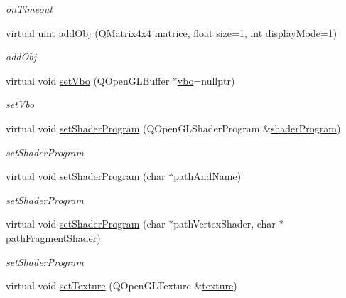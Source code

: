 \begin{DoxyCompactItemize}
\begin{DoxyCompactList}\small\item\em on\+Timeout \end{DoxyCompactList}\item 
virtual uint \hyperlink{classmyObjects_ad4388027a338e2d15f55b87499cdca42}{add\+Obj} (Q\+Matrix4x4 \hyperlink{classmyObjects_aef3994db6f38f3abbd4863acdac0612c}{matrice}, float \hyperlink{classmyObjects_ab522af7e49a03777cc176061c32db11c}{size}=1, int \hyperlink{classmyObjects_a0bdb1559971230bace7098dadc2d4ace}{display\+Mode}=1)
\begin{DoxyCompactList}\small\item\em add\+Obj \end{DoxyCompactList}\item 
virtual void \hyperlink{classmyObjects_a1ec9026bb331e4d07d8da372424bbcdf}{set\+Vbo} (Q\+Open\+G\+L\+Buffer $\ast$\hyperlink{classmyObjects_adf868552b7a0a8acbbef2e8b5470e403}{vbo}=nullptr)
\begin{DoxyCompactList}\small\item\em set\+Vbo \end{DoxyCompactList}\item 
virtual void \hyperlink{classmyObjects_a317bbb41dd176f37b9bf909637841e97}{set\+Shader\+Program} (Q\+Open\+G\+L\+Shader\+Program \&\hyperlink{classmyObjects_a3aebf3bf2954d78d703e927819a57559}{shader\+Program})
\begin{DoxyCompactList}\small\item\em set\+Shader\+Program \end{DoxyCompactList}\item 
virtual void \hyperlink{classmyObjects_a79a82b3ee54eaab203a1a5d8427cc84c}{set\+Shader\+Program} (char $\ast$path\+And\+Name)
\begin{DoxyCompactList}\small\item\em set\+Shader\+Program \end{DoxyCompactList}\item 
virtual void \hyperlink{classmyObjects_a8329f8b4d6818478737873390072c563}{set\+Shader\+Program} (char $\ast$path\+Vertex\+Shader, char $\ast$path\+Fragment\+Shader)
\begin{DoxyCompactList}\small\item\em set\+Shader\+Program \end{DoxyCompactList}\item 
virtual void \hyperlink{classmyObjects_a51cd02184d2634fabeee1f0845f5ad21}{set\+Texture} (Q\+Open\+G\+L\+Texture \&\hyperlink{classmyObjects_a25fb21a6fe5ef009137a77605d531c33}{texture})

\end{DoxyCompactItemize}
